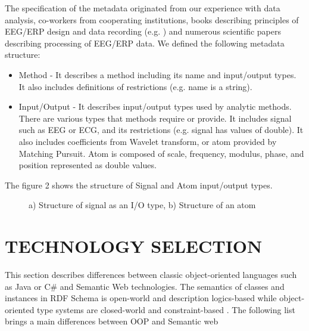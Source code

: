 \documentclass[a4paper,twoside]{article}
\begin{document}
The specification of the metadata originated from our experience
with data analysis, co-workers from cooperating institutions,
books describing principles of EEG/ERP design and data
recording (e.g. \cite{Luck05}) and numerous scientific papers describing
processing of EEG/ERP data. We defined the following metadata structure:
\begin{itemize}
	\item Method - It describes a method including its name and input/output types. It also includes definitions of restrictions (e.g. name is a string).
	
	\item Input/Output - It describes input/output types used by analytic methods. There are various types that methods require or provide. It includes signal such as EEG or ECG, and its restrictions (e.g. signal has values of double). It also includes coefficients from Wavelet transform, or atom provided by Matching Pursuit. Atom is composed of scale, frequency, modulus, phase, and position represented as double values. 
	
\end{itemize}

The figure 2 shows the structure of Signal and Atom input/output types. 

\begin{figure}[!h]

  \centering
   {}
  \caption{a) Structure of signal as an I/O type, b) Structure of an atom }
  \label{fig:SignalAndAtom}
 \end{figure}

\section{\uppercase{Technology Selection}}

\noindent This section describes differences between classic object-oriented languages such as Java or C\# and Semantic Web technologies. The semantics of classes and instances in RDF Schema is open-world and description logics-based while object-oriented type systems are closed-world and constraint-based \cite{Kalyanpur02}. The following list brings a main differences between OOP and Semantic web \cite{Oren07}
\end{document}
